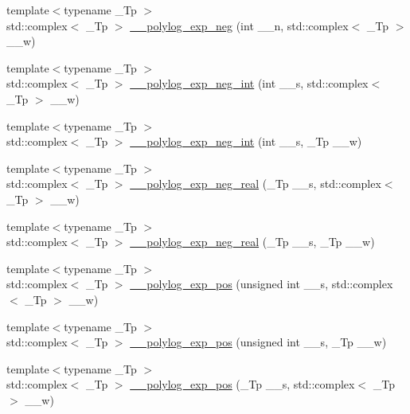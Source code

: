 \begin{DoxyCompactItemize}
\item 
{\footnotesize template$<$typename \+\_\+\+Tp $>$ }\\std\+::complex$<$ \+\_\+\+Tp $>$ \hyperlink{namespacestd_1_1____detail_a313ae48e1c4ed3c5296c8e45614af3d5}{\+\_\+\+\_\+polylog\+\_\+exp\+\_\+neg} (int \+\_\+\+\_\+n, std\+::complex$<$ \+\_\+\+Tp $>$ \+\_\+\+\_\+w)
\item 
{\footnotesize template$<$typename \+\_\+\+Tp $>$ }\\std\+::complex$<$ \+\_\+\+Tp $>$ \hyperlink{namespacestd_1_1____detail_a02b154619b2e4d0bf50dc303370d74cd}{\+\_\+\+\_\+polylog\+\_\+exp\+\_\+neg\+\_\+int} (int \+\_\+\+\_\+s, std\+::complex$<$ \+\_\+\+Tp $>$ \+\_\+\+\_\+w)
\item 
{\footnotesize template$<$typename \+\_\+\+Tp $>$ }\\std\+::complex$<$ \+\_\+\+Tp $>$ \hyperlink{namespacestd_1_1____detail_a7a186c84c1673a2beabba25c91119c66}{\+\_\+\+\_\+polylog\+\_\+exp\+\_\+neg\+\_\+int} (int \+\_\+\+\_\+s, \+\_\+\+Tp \+\_\+\+\_\+w)
\item 
{\footnotesize template$<$typename \+\_\+\+Tp $>$ }\\std\+::complex$<$ \+\_\+\+Tp $>$ \hyperlink{namespacestd_1_1____detail_a6320926219e1a9a653d9a793c7a3ad37}{\+\_\+\+\_\+polylog\+\_\+exp\+\_\+neg\+\_\+real} (\+\_\+\+Tp \+\_\+\+\_\+s, std\+::complex$<$ \+\_\+\+Tp $>$ \+\_\+\+\_\+w)
\item 
{\footnotesize template$<$typename \+\_\+\+Tp $>$ }\\std\+::complex$<$ \+\_\+\+Tp $>$ \hyperlink{namespacestd_1_1____detail_a65df07847bbb3c92518449fbc5787870}{\+\_\+\+\_\+polylog\+\_\+exp\+\_\+neg\+\_\+real} (\+\_\+\+Tp \+\_\+\+\_\+s, \+\_\+\+Tp \+\_\+\+\_\+w)
\item 
{\footnotesize template$<$typename \+\_\+\+Tp $>$ }\\std\+::complex$<$ \+\_\+\+Tp $>$ \hyperlink{namespacestd_1_1____detail_a0327d2970eba3a0a2d73c71c7a77701c}{\+\_\+\+\_\+polylog\+\_\+exp\+\_\+pos} (unsigned int \+\_\+\+\_\+s, std\+::complex$<$ \+\_\+\+Tp $>$ \+\_\+\+\_\+w)
\item 
{\footnotesize template$<$typename \+\_\+\+Tp $>$ }\\std\+::complex$<$ \+\_\+\+Tp $>$ \hyperlink{namespacestd_1_1____detail_ab13a4be6685dd222b654da3297342d7e}{\+\_\+\+\_\+polylog\+\_\+exp\+\_\+pos} (unsigned int \+\_\+\+\_\+s, \+\_\+\+Tp \+\_\+\+\_\+w)
\item 
{\footnotesize template$<$typename \+\_\+\+Tp $>$ }\\std\+::complex$<$ \+\_\+\+Tp $>$ \hyperlink{namespacestd_1_1____detail_a56b0f5bc6f4955469fd5f83105cbd466}{\+\_\+\+\_\+polylog\+\_\+exp\+\_\+pos} (\+\_\+\+Tp \+\_\+\+\_\+s, std\+::complex$<$ \+\_\+\+Tp $>$ \+\_\+\+\_\+w)

\end{DoxyCompactItemize}
